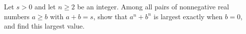 Let $s>0$ and let $n\ge2$ be an integer. Among all pairs of nonnegative real numbers $a\ge b$ with $a+b=s$, show that $a^n+b^n$ is largest exactly when $b=0$, and find this largest value.
